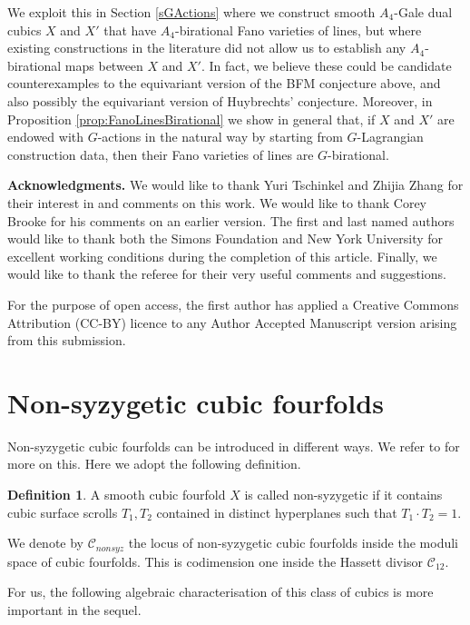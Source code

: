 \documentclass[11pt]{amsart}
\theoremstyle{plain}
\numberwithin{equation}{section}
\theoremstyle{definition}
\newtheorem{definition}[theorem]{Definition}
\theoremstyle{remark}
\newcommand{\calC}{\mathcal{C}}
\begin{document}
We exploit this in Section \ref{sGActions} where we construct smooth $A_4$-Gale dual cubics $X$ and $X'$ that have $A_4$-birational Fano varieties of lines, but where existing constructions in the literature did not allow us to establish any $A_4$-birational maps between $X$ and $X'$. In fact, we believe these could be candidate counterexamples to the equivariant version of the BFM conjecture above, and also possibly the equivariant version of Huybrechts' conjecture. Moreover, in Proposition \ref{prop:FanoLinesBirational} we show in general that, if $X$ and $X'$ are endowed with $G$-actions in the natural way by starting from $G$-Lagrangian construction data, then their Fano varieties of lines are $G$-birational.

\medskip

\textbf{Acknowledgments.} We would like to thank Yuri Tschinkel and Zhijia Zhang for their interest in and comments on this work. We would like to thank Corey Brooke for his comments on an earlier version. The first and last named authors would like to thank both the Simons Foundation and New York University for excellent working conditions during the completion of this article. Finally, we would like to thank the referee for their very useful comments and suggestions.

For the purpose of open access, the first author has applied a Creative Commons Attribution (CC-BY) licence to any Author Accepted Manuscript version arising from this submission.

\section{Non-syzygetic cubic fourfolds}\label{sNonsyz}

Non-syzygetic cubic fourfolds can be introduced in different ways. We refer to \cite[Section 2, in particular Def. 2.9]{BFMQ24} for more on this. Here we adopt the following definition. 

\begin{definition}\label{dNonsyz}
A smooth cubic fourfold $X$ is called non-syzygetic if it contains cubic surface scrolls $T_1, T_2$ contained in distinct hyperplanes such that $T_1\cdot T_2=1$.
\end{definition}

We denote by $\calC_{nonsyz}$ the locus of non-syzygetic cubic fourfolds inside the moduli space of cubic fourfolds. This is codimension one inside the Hassett divisor $\calC_{12}.$

For us, the following algebraic characterisation of this class of cubics is more important in the sequel. 
\end{document}
